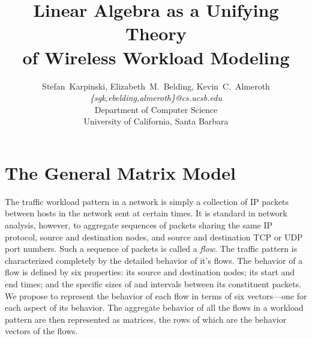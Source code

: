 \documentclass[conference]{IEEEtran}
\title{Linear Algebra as a Unifying Theory\\of Wireless Workload Modeling}
\author{
{\large{Stefan~Karpinski, Elizabeth~M.~Belding, Kevin~C.~Almeroth}}\\
\textit{\{sgk,ebelding,almeroth\}@cs.ucsb.edu}\vspace{0.5em}\\
Department of Computer Science\\
University of California, Santa Barbara
\vspace{-0.5em}
}
\newcommand{\caps}[1]{{\small{#1}}}
\begin{document}
\maketitle

%

\section{The General Matrix Model}
\label{sec:representations}


The traffic workload pattern in a network is simply a collection of \caps{IP} packets between hosts in the network sent at certain times. It is standard in network analysis, however, to aggregate sequences of packets sharing the same \caps{IP} protocol, source and destination nodes, and source and destination \caps{TCP} or \caps{UDP} port numbers. Such a sequence of packets is called a \textit{flow}. The traffic pattern is characterized completely by the detailed behavior of it's flows. The behavior of a flow is defined by six properties: its source and destination nodes; its start and end times; and the specific sizes of and intervals between its constituent packets. We propose to represent the behavior of each flow in terms of six vectors---one for each aspect of its behavior. The aggregate behavior of all the flows in a workload pattern are then represented as matrices, the rows of which are the behavior vectors of the flows.
\end{document}
